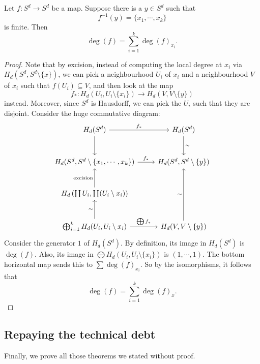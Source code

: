 \documentclass[a4paper]{article}
\begin{document}
\begin{thm}
  Let $f: S^d \to S^d$ be a map. Suppose there is a $y \in S^d$ such that
  \[
    f^{-1}(y) = \{x_1, \cdots, x_k\}
  \]
  is finite. Then
  \[
    \deg (f) = \sum_{i = 1}^k \deg(f)_{x_i}.
  \]
\end{thm}

\begin{proof}
  Note that by excision, instead of computing the local degree at $x_i$ via $H_d(S^d, S^d \setminus \{x\})$, we can pick a neighbourhood $U_i$ of $x_i$ and a neighbourhood $V$ of $x_i$ such that $f(U_i) \subseteq V$, and then look at the map
  \[
    f_*: H_d(U_i, U_i \setminus \{x_i\}) \to H_d(V, V \setminus \{y\})
  \]
  instead. Moreover, since $S^d$ is Hausdorff, we can pick the $U_i$ such that they are disjoint. Consider the huge commutative diagram:
  \[
    \begin{tikzcd}[row sep=large]
      H_d(S^d) \ar[r, "f_*"] \ar[d] & H_d(S^d) \ar[d, "\sim"]\\
      H_d(S^d, S^d \setminus \{x_1, \cdots, x_k\}) \ar[r, "f_*"] & H_d(S^d, S^d \setminus \{y\})\\
      H_d\left(\coprod U_i, \coprod (U_i \setminus x_i)\right) \ar[u, "\text{excision}"]\\
      \bigoplus_{i = 1}^ k H_d(U_i, U_i \setminus x_i) \ar[r, "\bigoplus f_*"] \ar[u, "\sim"] & H_d(V, V\setminus \{y\}) \ar[uu, "\sim"]
    \end{tikzcd}
  \]
  Consider the generator $1$ of $H_d(S^d)$. By definition, its image in $H_d(S^d)$ is $\deg(f)$. Also, its image in $\bigoplus H_d(U_i, U_i \setminus \{x_i\})$ is $(1, \cdots, 1)$. The bottom horizontal map sends this to $\sum \deg(f)_{x_i}$. So by the isomorphisms, it follows that
  \[
    \deg(f) = \sum_{i = 1}^k \deg(f)_x.
  \]
\end{proof}
\subsection{Repaying the technical debt}
Finally, we prove all those theorems we stated without proof.
\end{document}
